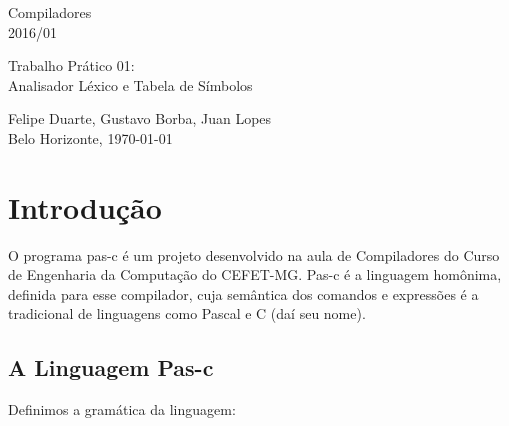 \documentclass[11pt]{article}
\begin{document}
\thispagestyle{empty}

\begin{center}
\begin{minipage}[l]{10cm}{
\center
Compiladores \\
2016/01 \\
}\end{minipage}
 \vfill
 \begin{minipage}[l]{11cm}{
   \begin{center}
   \Large{Trabalho Prático 01: \\ Analisador Léxico e Tabela de Símbolos}
   \end{center}
}\end{minipage}
\end{center}
 \vspace*{8cm}
 \begin{center}
 \begin{minipage}[l]{10cm}{
 \center Felipe Duarte, Gustavo  Borba, Juan Lopes\\
 Belo Horizonte, \today \\
 }
 \end{minipage}
 \end{center}

\newpage
\thispagestyle{empty}
\tableofcontents

\newpage
\clearpage
\setcounter{page}{1}

\section{Introdução}
	O programa pas-c é um projeto desenvolvido na aula de Compiladores do Curso de Engenharia da Computação do CEFET-MG. Pas-c é a linguagem homônima, definida para esse compilador, cuja semântica dos comandos e expressões é a tradicional de linguagens como Pascal e C (daí seu nome).
	
	\subsection{A Linguagem Pas-c}

		Definimos a gramática da linguagem:
		
\end{document}
